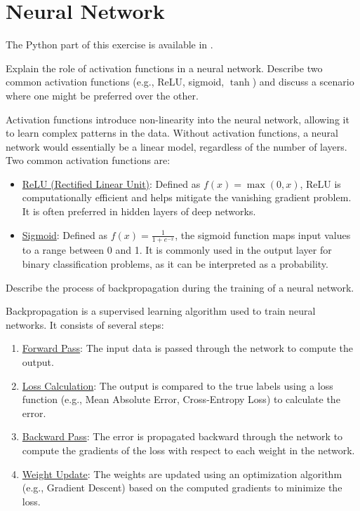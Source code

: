 \section{Neural Network}

The Python part of this exercise is available in .\\

\begin{ejercicio}
    Explain the role of activation functions in a neural network. Describe two common activation functions (e.g., ReLU, sigmoid, $\tanh$) and discuss a scenario where one might be preferred over the other.

    Activation functions introduce non-linearity into the neural network, allowing it to learn complex patterns in the data. Without activation functions, a neural network would essentially be a linear model, regardless of the number of layers.
    Two common activation functions are:
    \begin{itemize}
        \item \ul{ReLU (Rectified Linear Unit)}: Defined as $f(x) = \max(0, x)$, ReLU is computationally efficient and helps mitigate the vanishing gradient problem. It is often preferred in hidden layers of deep networks.
        \item \ul{Sigmoid}: Defined as $f(x) = \frac{1}{1 + e^{-x}}$, the sigmoid function maps input values to a range between 0 and 1. It is commonly used in the output layer for binary classification problems, as it can be interpreted as a probability.
    \end{itemize}
\end{ejercicio}

\begin{ejercicio}
    Describe the process of backpropagation during the training of a neural network.

    Backpropagation is a supervised learning algorithm used to train neural networks. It consists of several steps:
\begin{enumerate}
    \item \ul{Forward Pass}: The input data is passed through the network to compute the output.
    \item \ul{Loss Calculation}: The output is compared to the true labels using a loss function (e.g., Mean Absolute Error, Cross-Entropy Loss) to calculate the error.
    \item \ul{Backward Pass}: The error is propagated backward through the network to compute the gradients of the loss with respect to each weight in the network.
    \item \ul{Weight Update}: The weights are updated using an optimization algorithm (e.g., Gradient Descent) based on the computed gradients to minimize the loss.
\end{enumerate}
\end{ejercicio}

